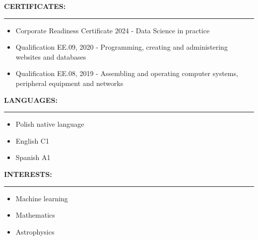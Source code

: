 \documentclass[10pt]{article}
\newcommand{\longline}{\rule{19.6cm}{1pt}}
\begin{document}
\noindent \fontsize{14pt}{14pt}\selectfont \textbf{\color{Violet}CERTIFICATES:}
\fontsize{10pt}{10pt}\selectfont 
\\ 
\noindent \longline 
\begin{itemize}[leftmargin=*]
    \item Corporate Readiness Certificate 2024 - Data Science in practice
    \item Qualification EE.09, 2020 - Programming, creating and administering websites and databases
    \item Qualification EE.08, 2019 - Assembling and operating computer systems, peripheral equipment and networks
\end{itemize}

\noindent \fontsize{14pt}{14pt}\selectfont \textbf{\color{Violet}LANGUAGES:}
\fontsize{10pt}{10pt}\selectfont
\\
\noindent \longline 
\begin{itemize}[leftmargin=*]
    \item Polish native language
    \item English C1
    \item Spanish A1
\end{itemize}

\noindent \fontsize{14pt}{14pt}\selectfont \textbf{\color{Violet}INTERESTS:}
\fontsize{10pt}{10pt}\selectfont
\\
\noindent \longline 
\begin{itemize}[leftmargin=*]
    \item Machine learning
    \item Mathematics
    \item Astrophysics
\end{itemize}
\end{document}
